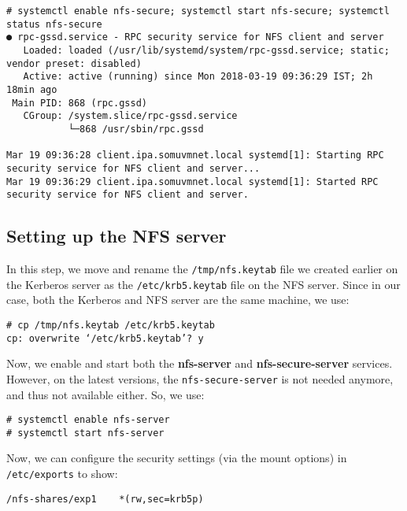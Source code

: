 \vspace{-15pt}
\begin{verbatim}
# systemctl enable nfs-secure; systemctl start nfs-secure; systemctl status nfs-secure
● rpc-gssd.service - RPC security service for NFS client and server
   Loaded: loaded (/usr/lib/systemd/system/rpc-gssd.service; static; vendor preset: disabled)
   Active: active (running) since Mon 2018-03-19 09:36:29 IST; 2h 18min ago
 Main PID: 868 (rpc.gssd)
   CGroup: /system.slice/rpc-gssd.service
           └─868 /usr/sbin/rpc.gssd

Mar 19 09:36:28 client.ipa.somuvmnet.local systemd[1]: Starting RPC security service for NFS client and server...
Mar 19 09:36:29 client.ipa.somuvmnet.local systemd[1]: Started RPC security service for NFS client and server.
\end{verbatim}
\vspace{-10pt}	

\subsection{Setting up the NFS server}
In this step, we move and rename the \verb|/tmp/nfs.keytab| file we created earlier on the Kerberos server as the \verb|/etc/krb5.keytab| file on the NFS server. Since in our case, both the Kerberos and NFS server are the same machine, we use:

\vspace{-15pt}
\begin{verbatim}
# cp /tmp/nfs.keytab /etc/krb5.keytab 
cp: overwrite ‘/etc/krb5.keytab’? y
\end{verbatim}
\vspace{-10pt}	

\noindent
Now, we enable and start both the \textbf{nfs-server} and \textbf{nfs-secure-server} services. However, on the latest versions, the \verb|nfs-secure-server| is not needed anymore, and thus not available either. So, we use:

\vspace{-15pt}
\begin{verbatim}
# systemctl enable nfs-server
# systemctl start nfs-server
\end{verbatim}
\vspace{-10pt}	

\noindent
Now, we can configure the security settings (via the mount options) in \verb|/etc/exports| to show:

\vspace{-15pt}
\begin{verbatim}
/nfs-shares/exp1	*(rw,sec=krb5p)
\end{verbatim}
\vspace{-10pt}	

